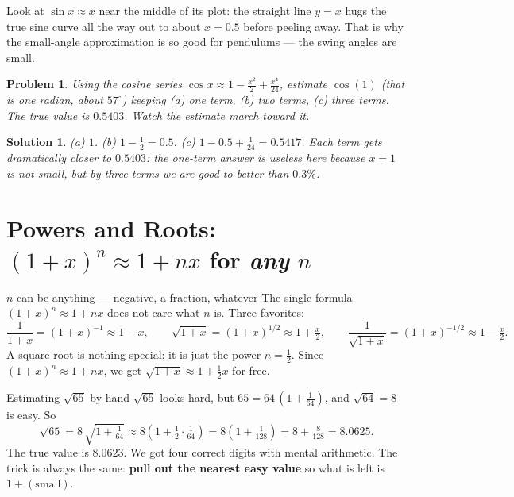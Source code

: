 \documentclass[11pt]{article}
\newcommand{\clearpts}{\addtocounter{tpts}{\value{cpts}} \setcounter{cpts}{0}}
\newcommand{\pts}[1]{\clearpts \setcounter{cpts}{#1}}
\newtheorem*{solution}{Solution}
\theoremstyle{mystyle}
\newtheorem{pproblem}{Problem}
\begin{document}
\begin{psremark*}{}{}
Look at $\sin x \approx x$ near the middle of its plot: the straight line $y = x$ hugs
the true sine curve all the way out to about $x = 0.5$ before peeling away. That is why
the small-angle approximation is so good for pendulums --- the swing angles are small.
\end{psremark*}

\pts{4}
\begin{pproblem}
Using the cosine series $\cos x \approx 1 - \tfrac{x^2}{2} + \tfrac{x^4}{24}$, estimate
$\cos(1)$ (that is one radian, about $57^\circ$) keeping (a) one term, (b) two terms,
(c) three terms. The true value is $0.5403$. Watch the estimate march toward it.
\end{pproblem}
\begin{solution}
(a) $1$. \quad
(b) $1 - \tfrac12 = 0.5$. \quad
(c) $1 - 0.5 + \tfrac{1}{24} = 0.5417$. \quad
Each term gets dramatically closer to $0.5403$: the one-term answer is useless here
because $x=1$ is not small, but by three terms we are good to better than $0.3\%$.
\end{solution}

\section{Powers and Roots: $(1+x)^n \approx 1 + nx$ for \emph{any} $n$}

\begin{psidea}{$n$ can be anything --- negative, a fraction, whatever}{}
The single formula $(1+x)^n \approx 1 + nx$ does not care what $n$ is. Three favorites:
\[
\frac{1}{1+x} = (1+x)^{-1} \approx 1 - x,\qquad
\sqrt{1+x} = (1+x)^{1/2} \approx 1 + \tfrac{x}{2},\qquad
\frac{1}{\sqrt{1+x}} = (1+x)^{-1/2} \approx 1 - \tfrac{x}{2}.
\]
A square root is nothing special: it is just the power $n = \tfrac12$. Since
$(1+x)^n \approx 1 + nx$, we get $\sqrt{1+x} \approx 1 + \tfrac12 x$ for free.
\end{psidea}

\begin{psexample}{Estimating $\sqrt{65}$ by hand}{}
$\sqrt{65}$ looks hard, but $65 = 64\,(1 + \tfrac{1}{64})$, and $\sqrt{64} = 8$ is easy.
So
\[
\sqrt{65} = 8\,\sqrt{1 + \tfrac{1}{64}} \approx 8\left(1 + \tfrac12\cdot\tfrac{1}{64}\right)
         = 8\left(1 + \tfrac{1}{128}\right) = 8 + \tfrac{8}{128} = 8.0625.
\]
The true value is $8.0623$. We got four correct digits with mental arithmetic. The trick
is always the same: \textbf{pull out the nearest easy value} so what is left is
$1 + (\text{small})$.
\end{psexample}
\end{document}
